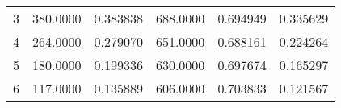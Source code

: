 \begin{tabular}{lrrrrr}
\multicolumn{1}{c}{3}&\multicolumn{1}{c}{380.0000}&\multicolumn{1}{c}{0.383838}&\multicolumn{1}{c}{688.0000}&\multicolumn{1}{c}{0.694949}&\multicolumn{1}{c}{0.335629}\\
\multicolumn{1}{c}{4}&\multicolumn{1}{c}{264.0000}&\multicolumn{1}{c}{0.279070}&\multicolumn{1}{c}{651.0000}&\multicolumn{1}{c}{0.688161}&\multicolumn{1}{c}{0.224264}\\
\multicolumn{1}{c}{5}&\multicolumn{1}{c}{180.0000}&\multicolumn{1}{c}{0.199336}&\multicolumn{1}{c}{630.0000}&\multicolumn{1}{c}{0.697674}&\multicolumn{1}{c}{0.165297}\\
\multicolumn{1}{c}{6}&\multicolumn{1}{c}{117.0000}&\multicolumn{1}{c}{0.135889}&\multicolumn{1}{c}{606.0000}&\multicolumn{1}{c}{0.703833}&\multicolumn{1}{c}{0.121567}\\
\bottomrule
\end{tabular}
